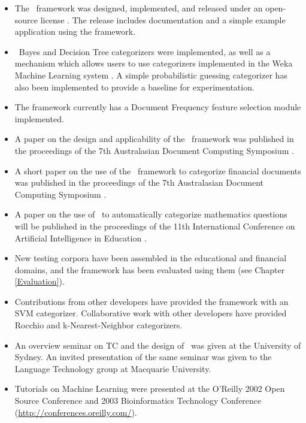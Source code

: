 \begin{itemize}
\item The \aicat\ framework was designed, implemented, and released
  under an open-source license \cite{cpan}.  The release includes
  documentation and a simple example application using the framework.
\item \naive\ Bayes and Decision Tree categorizers were implemented,
  as well as a mechanism which allows users to use categorizers
  implemented in the Weka Machine Learning system \cite{weka:99}.  A
  simple probabilistic guessing categorizer has also been implemented
  to provide a baseline for experimentation.
\item The framework currently has a Document Frequency feature
  selection module implemented.
\item A paper on the design and applicability of the \aicat\ framework
  was published in the proceedings of the 7th Australasian Document
  Computing Symposium \cite{williams:02}.
\item A short paper on the use of the \aicat\ framework to categorize
  financial documents was published in the proceedings of the
  7th Australasian Document Computing Symposium \cite{calvo:02}.
\item A paper on the use of \aicat\ to automatically categorize
  mathematics questions will be published in the
  proceedings of the 11th International Conference on Artificial Intelligence in
  Education \cite{williams:03}.
\item New testing corpora have been assembled in the educational and
  financial domains, and the framework has been evaluated using them
  (see Chapter \ref{Evaluation}).
\item Contributions from other developers have provided the framework
  with an SVM categorizer.  Collaborative work with other developers
  have provided Rocchio and k-Nearest-Neighbor categorizers.
\item An overview seminar on TC and the design of \aicat\ was given at
  the University of Sydney.  An invited presentation of the same
  seminar was given to the Language Technology group at Macquarie
  University.
\item Tutorials on Machine Learning were presented at the O'Reilly
  2002 Open Source Conference and 2003 Bioinformatics Technology
  Conference (\url{http://conferences.oreilly.com/}).
\end{itemize}

